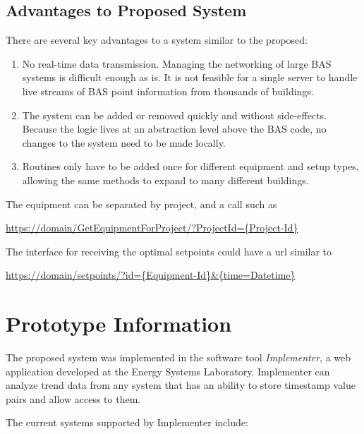 \subsection{Advantages to Proposed System}

There are several key advantages to a system similar to the proposed:

\begin{enumerate}
    \item No real-time data transmission. Managing the networking of
        large BAS systems is difficult enough as is. It is not feasible
        for a single server to handle live streams of BAS point
        information from thousands of buildings. 

    \item The system can be added or removed quickly and without
        side-effects. Because the logic lives at an abstraction level
        above the BAS code, no changes to the system need to be made
        locally. 

    \item Routines only have to be added once for different equipment
        and setup types, allowing the same methods to expand to many
        different buildings. 
\end{enumerate}

The equipment can be separated by project, and a call such as

\url{https://domain/GetEquipmentForProject/?ProjectId={Project-Id}}

The interface for receiving the optimal setpoints could have a url
similar to 

\url{https://domain/setpoints/?id={Equipment-Id}\&{time=Datetime}}

\section{Prototype Information}

The proposed system was implemented in the software tool
\textit{Implementer}, a web application developed at the Energy Systems
Laboratory. Implementer can analyze trend data from any system that has
an ability to store timestamp value pairs and allow access to them. 

The current systems supported by Implementer include:

